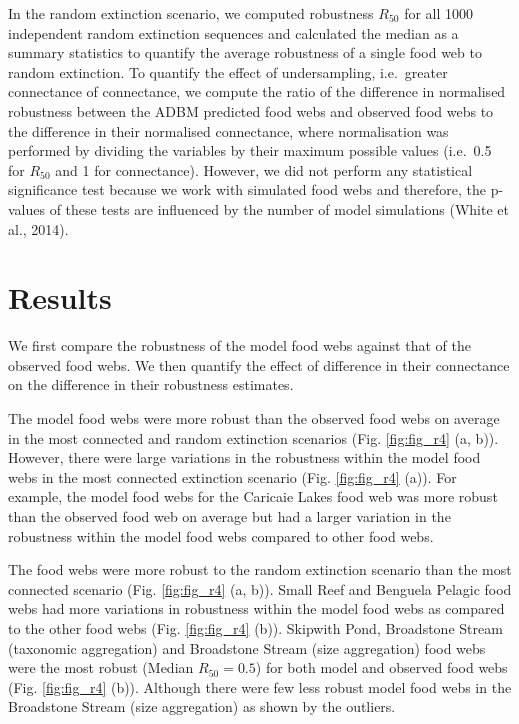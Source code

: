 \documentclass{article}
\begin{document}
In the random extinction scenario, we computed robustness \(R_{50}\) for
all 1000 independent random extinction sequences and calculated the
median as a summary statistics to quantify the average robustness of a
single food web to random extinction. To quantify the effect of
undersampling, i.e.~greater connectance of connectance, we compute the
ratio of the difference in normalised robustness between the ADBM
predicted food webs and observed food webs to the difference in their
normalised connectance, where normalisation was performed by dividing
the variables by their maximum possible values (i.e.~0.5 for \(R_{50}\)
and 1 for connectance). However, we did not perform any statistical
significance test because we work with simulated food webs and
therefore, the p-values of these tests are influenced by the number of
model simulations (White et al., 2014).

\hypertarget{results}{%
\section{Results}\label{results}}

We first compare the robustness of the model food webs against that of
the observed food webs. We then quantify the effect of difference in
their connectance on the difference in their robustness estimates.

The model food webs were more robust than the observed food webs on
average in the most connected and random extinction scenarios (Fig.
\ref{fig:fig_r4} (a, b)). However, there were large variations in the
robustness within the model food webs in the most connected extinction
scenario (Fig. \ref{fig:fig_r4} (a)). For example, the model food webs
for the Caricaie Lakes food web was more robust than the observed food
web on average but had a larger variation in the robustness within the
model food webs compared to other food webs.

The food webs were more robust to the random extinction scenario than
the most connected scenario (Fig. \ref{fig:fig_r4} (a, b)). Small Reef
and Benguela Pelagic food webs had more variations in robustness within
the model food webs as compared to the other food webs (Fig.
\ref{fig:fig_r4} (b)). Skipwith Pond, Broadstone Stream (taxonomic
aggregation) and Broadstone Stream (size aggregation) food webs were the
most robust (Median \(R_{50} = 0.5\)) for both model and observed food
webs (Fig. \ref{fig:fig_r4} (b)). Although there were few less robust
model food webs in the Broadstone Stream (size aggregation) as shown by
the outliers.
\end{document}
